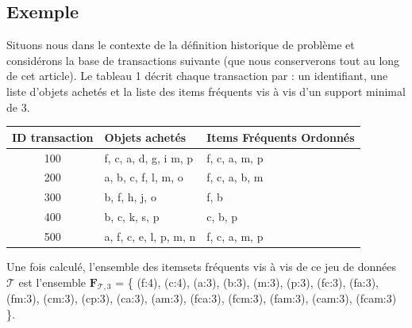 \documentclass[a4paper,10pt]{report}
\begin{document}
\subsection{Exemple}
	Situons nous dans le contexte de la définition historique de problème et considérons la base de transactions suivante (que nous conserverons tout au long de cet article). Le tableau 1 décrit chaque transaction par : un identifiant, une liste d'objets achetés et la liste des items fréquents vis à vis d'un support minimal de  3.\\

\begin{tabular}{|c|l|l|}
	\hline
	ID transaction & Objets achetés & Items Fréquents Ordonnés \\
	\hline
	100 & f, c, a, d, g, i m, p & f, c, a, m, p \\
	\hline
	200 & a, b, c, f, l, m, o & f, c, a, b, m \\
	\hline
	300 & b, f, h, j, o & f, b \\
	\hline
	400 & b, c, k, s, p & c, b, p \\
	\hline
	500 & a, f, c, e, l, p, m, n & f, c, a, m, p \\
	\hline	
\end{tabular}
\vspace{0.4cm}

\hspace{0.15cm}Une fois calculé, l'ensemble des itemsets fréquents vis à vis de ce jeu de données $\mathcal{T}$ est l'ensemble $\textbf{F}_{\mathcal{T},3}$ = \{ (f:4), (c:4), (a:3), (b:3), (m:3), (p:3), (fc:3), (fa:3), (fm:3), (cm:3), (cp:3), (ca:3), (am:3), (fca:3), (fcm:3), (fam:3), (cam:3), (fcam:3) \}.  \\
\end{document}
